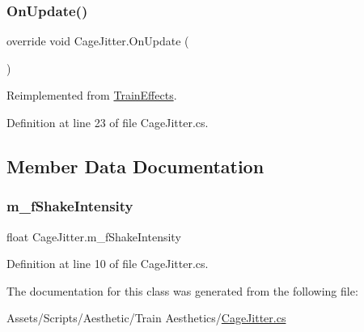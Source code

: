 \subsubsection{\texorpdfstring{On\+Update()}{OnUpdate()}}
{\footnotesize\ttfamily override void Cage\+Jitter.\+On\+Update (\begin{DoxyParamCaption}{ }\end{DoxyParamCaption})\hspace{0.3cm}{\ttfamily [virtual]}}



Reimplemented from \mbox{\hyperlink{class_train_effects_a245e2891464a93bda2d8f80c1fb53e2c}{Train\+Effects}}.



Definition at line 23 of file Cage\+Jitter.\+cs.



\subsection{Member Data Documentation}
\mbox{\label{class_cage_jitter_ac4025285173b994f6850804991153601}} 
\subsubsection{\texorpdfstring{m\+\_\+f\+Shake\+Intensity}{m\_fShakeIntensity}}
{\footnotesize\ttfamily float Cage\+Jitter.\+m\+\_\+f\+Shake\+Intensity}



Definition at line 10 of file Cage\+Jitter.\+cs.



The documentation for this class was generated from the following file\+:\begin{DoxyCompactItemize}
\item 
Assets/\+Scripts/\+Aesthetic/\+Train Aesthetics/\mbox{\hyperlink{_cage_jitter_8cs}{Cage\+Jitter.\+cs}}\end{DoxyCompactItemize}
